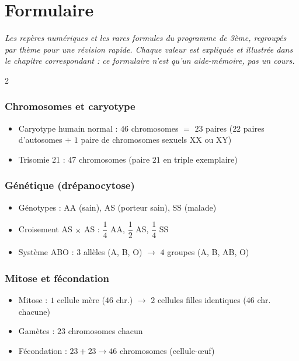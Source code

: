 \chapter{Formulaire}

\noindent\textit{Les repères numériques et les rares formules du programme de 3ème,
regroupés par thème pour une révision rapide. Chaque valeur est expliquée et illustrée
dans le chapitre correspondant : ce formulaire n'est qu'un aide-mémoire, pas un
cours.}
\vspace{8pt}

\begin{multicols}{2}

\subsection*{\color{onbo}Chromosomes et caryotype}
\begin{itemize}
\item Caryotype humain normal : $46$ chromosomes $=$ $23$ paires ($22$ paires
d'autosomes $+$ $1$ paire de chromosomes sexuels XX ou XY)
\item Trisomie 21 : $47$ chromosomes (paire $21$ en triple exemplaire)
\end{itemize}

\subsection*{\color{onbo}Génétique (drépanocytose)}
\begin{itemize}
\item Génotypes : AA (sain), AS (porteur sain), SS (malade)
\item Croisement AS $\times$ AS : $\dfrac14$ AA, $\dfrac12$ AS, $\dfrac14$ SS
\item Système ABO : $3$ allèles (A, B, O) $\to$ $4$ groupes (A, B, AB, O)
\end{itemize}

\subsection*{\color{onbo}Mitose et fécondation}
\begin{itemize}
\item Mitose : $1$ cellule mère ($46$ chr.) $\to$ $2$ cellules filles identiques
($46$ chr. chacune)
\item Gamètes : $23$ chromosomes chacun
\item Fécondation : $23+23\to46$ chromosomes (cellule-œuf)
\end{itemize}


\end{multicols}
